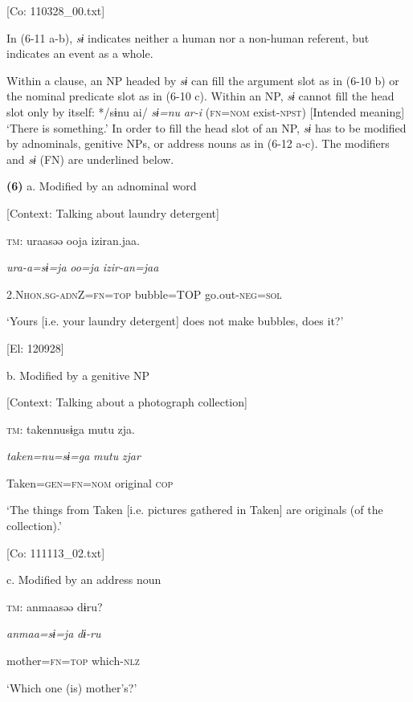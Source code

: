       [Co: 110328\_00.txt]

In (6-11 a-b), \textit{sɨ} indicates neither a human nor a non-human referent, but indicates an event as a whole.

  Within a clause, an NP headed by \textit{sɨ} can fill the argument slot as in (6-10 b) or the nominal predicate slot as in (6-10 c). Within an NP, \textit{sɨ} cannot fill the head slot only by itself: */sɨnu ai/ \textit{sɨ=nu} \textit{ar-i} (\textsc{fn}=\textsc{nom} exist-\textsc{npst}) [Intended meaning] ‘There is something.’ In order to fill the head slot of an NP, \textit{sɨ} has to be modified by adnominals, genitive NPs, or address nouns as in (6-12 a-c). The modifiers and \textit{sɨ} (FN) are underlined below.

\textbf{(6)}  a.  Modified by an adnominal word

    [Context: Talking about laundry detergent]

    \textsc{tm}:  uraasəə  ooja  iziran.jaa.

      \textit{ura-a=sɨ=ja}  \textit{oo=ja}  \textit{izir-an=jaa}

      2.N\textsc{hon}.\textsc{sg}-\textsc{adn}Z=\textsc{fn}=\textsc{top}  bubble=TOP  go.out-\textsc{neg}=\textsc{sol}

      ‘Yours [i.e. your laundry detergent] does not make bubbles, does it?’

      [El: 120928]

  b.  Modified by a genitive NP

    [Context: Talking about a photograph collection]

    \textsc{tm}:  {\textbar}taken{\textbar}nusɨga  mutu  zja.

      \textit{taken=nu=sɨ=ga}  \textit{mutu}  \textit{zjar}

      Taken=\textsc{gen}=\textsc{fn}=\textsc{nom}  original  \textsc{cop}

      ‘The things from Taken [i.e. pictures gathered in Taken] are originals (of the collection).’

      [Co: 111113\_02.txt]

  c.  Modified by an address noun

    \textsc{tm}:  anmaasəə  dɨru?

      \textit{anmaa=sɨ=ja}  \textit{dɨ-ru}

      mother=\textsc{fn}=\textsc{top}  which-\textsc{nlz}

      ‘Which one (is) mother’s?’


